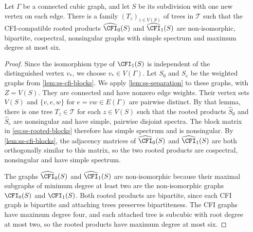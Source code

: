 \begin{lemma}\label{lem:ss-cfi-spectrum}
Let $\Gamma$ be a connected cubic graph, and let $S$ be its subdivision
with one new vertex on each edge.
There is a family $(T_z)_{z\in V(S)}$ of trees in $\mathcal T$ such that the
CFI-compatible rooted products $\widehat{\CFI}_0(S)$ and $\widehat{\CFI}_1(S)$
are non-isomorphic, bipartite, cospectral, nonsingular graphs with
simple spectrum and maximum degree at most six.
\end{lemma}
\begin{proof}
Since the isomorphism type of $\CFI_1(S)$ is independent of the
distinguished vertex $v_*$, we choose $v_*\in V(\Gamma)$.
Let $S_0$ and $S_e$ be the weighted graphs from \cref{lem:ss-cfi-blocks}.
We apply \cref{lem:ss-separation} to these graphs,
with $Z=V(S)$.
They are connected and have nonzero edge weights. Their vertex sets
$V(S)$ and $\{v,e,w\}$ for $e=vw\in E(\Gamma)$ are pairwise distinct.
By that lemma, there is one tree $T_z\in\mathcal T$ for each
$z\in V(S)$ such that the rooted products $\widehat S_0$ and
$\widehat S_e$ are nonsingular and have simple, pairwise disjoint
spectra.
The block matrix in \cref{eq:ss-rooted-blocks} therefore has simple
spectrum and is nonsingular.
By \cref{lem:ss-cfi-blocks}, the adjacency matrices of
$\widehat{\CFI}_0(S)$ and $\widehat{\CFI}_1(S)$ are both
orthogonally similar to this matrix, so the two rooted products are
cospectral, nonsingular and have simple spectrum.

The graphs $\widehat{\CFI}_0(S)$ and $\widehat{\CFI}_1(S)$ are
non-isomorphic because their maximal subgraphs of minimum degree at least two
are the non-isomorphic graphs $\CFI_0(S)$ and $\CFI_1(S)$.
Both rooted products are bipartite, since each CFI graph is bipartite
and attaching trees preserves bipartiteness.
The CFI graphs have maximum degree four, and each attached tree is
subcubic with root degree at most two, so the rooted products have
maximum degree at most six.
\end{proof}

